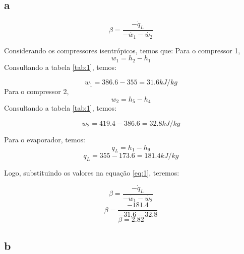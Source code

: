 \subsection{a}

\begin{equation}
\beta = \frac{ -\dot{q}_{L}  }{ -\dot{w_{1}} - \dot{w_{2}} }
\label{eq:1}
\end{equation}

Considerando os compressores isentrópicos, temos que:
Para o compressor 1,
\[w_{1} = h_{2} - h_{1}\]
Consultando a tabela \ref{tab:1}, temos:

\[w_{1} = 386.6 - 355 = 31.6 kJ/kg\]
Para o compressor 2,
\[w_{2} = h_{5} - h_{4}\]
Consultando a tabela \ref{tab:1}, temos:

\[w_{2} = 419.4 - 386.6 = 32.8 kJ/kg\]

Para o evaporador, temos:
\[q_{L} = h_{1} - h_{9}\]
\[q_{L} = 355 - 173.6 = 181.4 kJ/kg\]

Logo, substituindo os valores na equação \ref{eq:1}, teremos:

\[\beta = \frac{ -\dot{q}_{L}  }{ -\dot{w_{1}} - \dot{w_{2}} }\]
\[\beta = \frac{ -181.4  }{ -31.6 - 32.8 } \]
\[\beta = 2.82\]

\pagebreak

\subsection{b}





